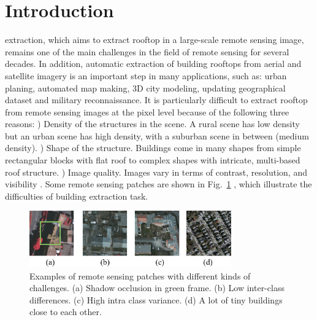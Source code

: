 %
\section{Introduction}
\label{sec:intro}



 extraction, which aims to extract rooftop in a large-scale remote sensing image, remains one of the main challenges in the field of remote sensing for several decades. In addition, automatic extraction of building rooftops from aerial and satellite imagery is an important step in many applications, such as: urban planing, automated map making, 3D city modeling, updating geographical dataset and military reconnaissance. It is particularly difficult to extract rooftop from remote sensing images at the pixel level because of the following three reasons: ) Density of the structures in the scene. A rural scene has low density but an urban scene has high density, with a suburban scene in between (medium density).  ) Shape of the structure. Buildings come in many shapes from simple rectangular blocks with flat roof to complex shapes with intricate, multi-based roof structure.  ) Image quality. Images vary in terms of contrast, resolution, and visibility  \cite{IEEEexample:huertas1988detecting}. Some remote sensing patches are shown in Fig.~\ref{fig:intro}  , which illustrate the difficulties of building extraction task. 


\begin{figure}
\includegraphics[width=8.7cm]{Figures/challenge.eps}
\caption{Examples of remote sensing patches with different kinds of challenges. (a) Shadow occlusion in green frame. (b) Low inter-class differences. (c) High intra class variance. (d) A lot of tiny buildings close to each other.}
\label{fig:intro}
\end{figure}


